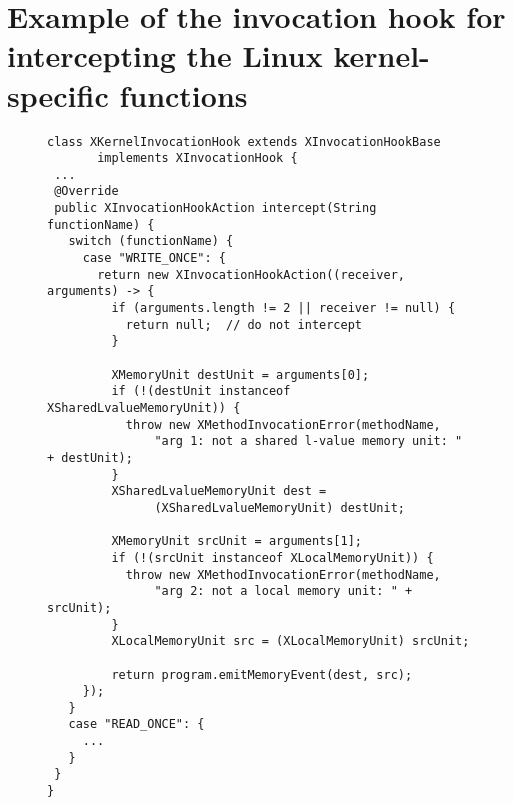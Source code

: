 \section{Example of the invocation hook for intercepting the Linux kernel-specific functions}
\label{apx:hook}

\begin{figure}[H]
\begin{lstlisting}
class XKernelInvocationHook extends XInvocationHookBase 
       implements XInvocationHook {
 ...
 @Override
 public XInvocationHookAction intercept(String functionName) {
   switch (functionName) {
     case "WRITE_ONCE": {
       return new XInvocationHookAction((receiver, arguments) -> {
         if (arguments.length != 2 || receiver != null) {
           return null;  // do not intercept
         }

         XMemoryUnit destUnit = arguments[0];
         if (!(destUnit instanceof XSharedLvalueMemoryUnit)) {
           throw new XMethodInvocationError(methodName, 
               "arg 1: not a shared l-value memory unit: " + destUnit);
         }
         XSharedLvalueMemoryUnit dest = 
               (XSharedLvalueMemoryUnit) destUnit;

         XMemoryUnit srcUnit = arguments[1];
         if (!(srcUnit instanceof XLocalMemoryUnit)) {
           throw new XMethodInvocationError(methodName, 
               "arg 2: not a local memory unit: " + srcUnit);
         }
         XLocalMemoryUnit src = (XLocalMemoryUnit) srcUnit;

         return program.emitMemoryEvent(dest, src);
     });
   }
   case "READ_ONCE": {
     ...
   }
 }
}
\end{lstlisting}
\end{figure}